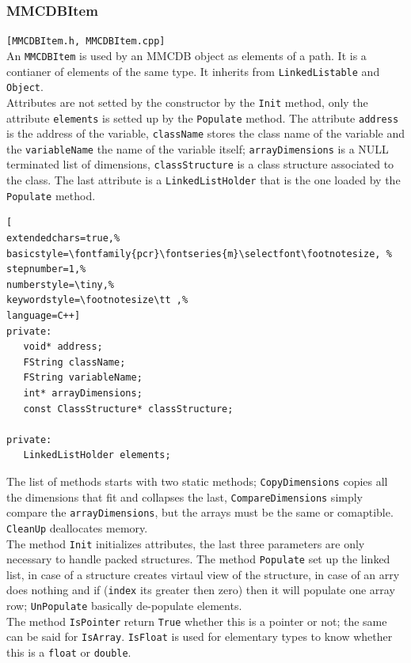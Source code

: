 \subsubsection{MMCDBItem}
\texttt{[MMCDBItem.h, MMCDBItem.cpp]}\\
An \texttt{MMCDBItem} is used by an MMCDB object as elements of a path. It is a contianer of elements of the same type. It inherits from \texttt{LinkedListable} and \texttt{Object}. \\


Attributes are not setted by the constructor by the \texttt{Init} method, only the attribute \texttt{elements} is setted up by the \texttt{Populate} method. The attribute \texttt{address} is the address of the variable, \texttt{className} stores the class name of the variable and the \texttt{variableName} the name of the variable itself; \texttt{arrayDimensions} is a NULL terminated list of dimensions, \texttt{classStructure} is a class structure associated to the class. The last attribute is a \texttt{LinkedListHolder} that is the one loaded by the \texttt{Populate} method.

\begin{lstlisting}[
extendedchars=true,%
basicstyle=\fontfamily{pcr}\fontseries{m}\selectfont\footnotesize, %
stepnumber=1,%
numberstyle=\tiny,%
keywordstyle=\footnotesize\tt ,%
language=C++]
private:
   void* address;
   FString className;
   FString variableName;
   int* arrayDimensions;
   const ClassStructure* classStructure;

private:
   LinkedListHolder elements;
\end{lstlisting}

The list of methods starts with two static methods; \texttt{CopyDimensions} copies all the dimensions that fit and collapses the last, \texttt{CompareDimensions} simply compare the \texttt{arrayDimensions}, but the arrays must be the same or comaptible. \texttt{CleanUp} deallocates memory. \\

The method \texttt{Init} initializes attributes, the last three parameters are only necessary to handle packed structures. The method \texttt{Populate} set up the linked list, in case of a structure creates virtaul view of the structure, in case of an arry does nothing and if (\texttt{index} its greater then zero) then it will populate one array row; \texttt{UnPopulate} basically de-populate elements. \\


The method \texttt{IsPointer} return \texttt{True} whether this is a pointer or not; the same can be said for \texttt{IsArray}. \texttt{IsFloat} is used for elementary types to know whether this is a \texttt{float} or \texttt{double}.

